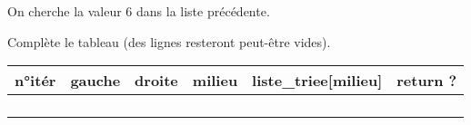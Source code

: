 \begin{exercice}

	On cherche la valeur 6 dans la liste précédente.

	Complète le tableau (des lignes resteront peut-être vides).
	\begin{center}
		\begin{tabular}{|c|c|c|c|c|c|}
			\hline
			{\ccell  n°itér} & {\ccell  gauche} & {\ccell  droite} & {\ccell  milieu} & {\ccell  liste\_triee[milieu]} & {\ccell  return ?} \\
			\hline
			                                                   &                               &                               &                               &                                             &                                 \\
			\hline
			                                                   &                               &                               &                               &                                             &                                 \\
			\hline
			                                                   &                               &                               &                               &                                             &                                 \\
			\hline
			                                                   &                               &                               &                               &                                             &                                 \\
			\hline
		\end{tabular}
	\end{center}


\end{exercice}
